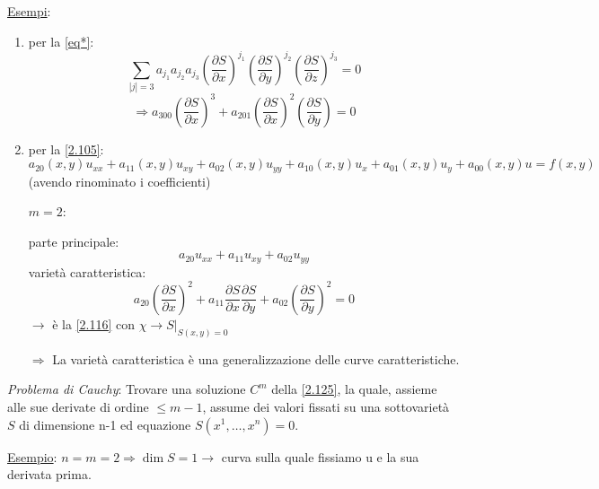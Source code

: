 \documentclass[a4paper,11pt]{report}
\begin{document}
\underline{Esempi}:
\begin{enumerate}[label=(\roman*)]
\item per la \eqref{eq*}: 
\[
\sum_{|j| = 3}a_{j_1} a_{j_2} a_{j_3}\left(\frac{\partial S}{\partial x}\right)^{j_1}\left(\frac{\partial S}{\partial y}\right)^{j_2}\left(\frac{\partial S}{\partial z}\right)^{j_3}=0
\]
\[
\Rightarrow a_{300}\left(\frac{\partial S}{\partial x}\right)^3 + a_{201}\left(\frac{\partial S}{\partial x}\right)^2\left(\frac{\partial S}{\partial y}\right)=0
\]
\item per la \eqref{2.105}:
\[
a_{20}(x,y)u_{xx}+a_{11}(x,y)u_{xy} + a_{02}(x,y)u_{yy} + a_{10}(x,y)u_x + a_{01}(x,y)u_y + a_{00}(x,y)u = f(x,y)
\]
(avendo rinominato i coefficienti)

$m=2$: 

parte principale:
\[
a_{20}u_{xx} + a_{11}u_{xy} + a_{02}u_{yy}
\]
variet\`a caratteristica:
\[
a_{20}\left(\frac{\partial S}{\partial x}\right)^2 + a_{11}\frac{\partial S}{\partial x}\frac{\partial S}{\partial y} + a_{02}\left(\frac{\partial S}{\partial y}\right)^2=0
\]
$\rightarrow$ \`e la \eqref{2.116} con $\chi \rightarrow S|_{S(x,y)=0}$

$\Rightarrow$ La variet\`a caratteristica \`e una generalizzazione delle curve caratteristiche.
\end{enumerate}

\emph{Problema di Cauchy}: Trovare una soluzione $C^m$ della \eqref{2.125}, la quale, assieme alle sue derivate di ordine $\leq m-1$, assume dei valori fissati su una sottovariet\`a $S$ di dimensione n-1 ed equazione $S(x^1,\dots, x^n)=0$.

\medskip

\underline{Esempio}: $n=m=2 \Rightarrow \dim S=1 \rightarrow$ curva sulla quale fissiamo u e la sua derivata prima.
\end{document}
